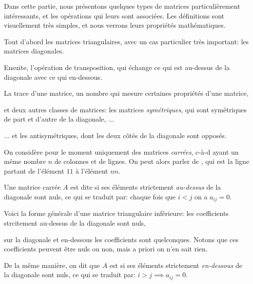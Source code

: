 







\debuttexte


\diapo

\change
Dans cette partie, nous présentons quelques types de matrices particulièrement intéressants, 
et les opérations qui leurs sont associées. Les définitions sont visuellement très simples, 
et nous verrons leurs propriétés mathématiques.

\change
Tout d'abord les matrices triangulaires, avec un cas particulier très important:
les matrices diagonales.

\change
Ensuite, l'opération de transposition, qui échange ce qui est au-dessus de la diagonale avec ce qui 
en-dessous.

\change
La trace d'une matrice, un nombre qui mesure certaines propriétés d'une matrice,

\change
et deux autres classes de matrices: les matrices \emph{symétriques}, qui sont symétriques 
de part et d'autre de la diagonale, ...

\change
... et les antisymétriques, dont les deux côtés de la diagonale sont opposés.

\diapo

On considère pour le moment uniquement des matrices \emph{carrées}, c-à-d ayant un même nombre 
$n$ de colonnes et de lignes. On peut alors parler de , 
qui est la ligne partant de l'élément $11$ à l'élément $n n$.

\change
Une matrice carrée $A$ est dite  si ses éléments strictement 
\emph{au-dessus} de la diagonale sont nuls, ce qui se traduit par: chaque fois que $i < j$
on a $a_{ij} = 0$. 

\change
Voici la forme générale d'une matrice triangulaire inférieure: les coefficients strcitement au-dessus de la diagonale sont nuls,

sur la diagonale et en-dessous les coefficients sont quelconques. 
Notons que ces coefficients peuvent 
être nuls ou non, mais a priori on n'en sait rien.

\change
De la même manière, on dit que $A$ est  si ses éléments strictement 
\emph{en-dessous} de la diagonale sont nuls, ce qui se traduit par: $i > j \implies a_{ij} = 0$. 

